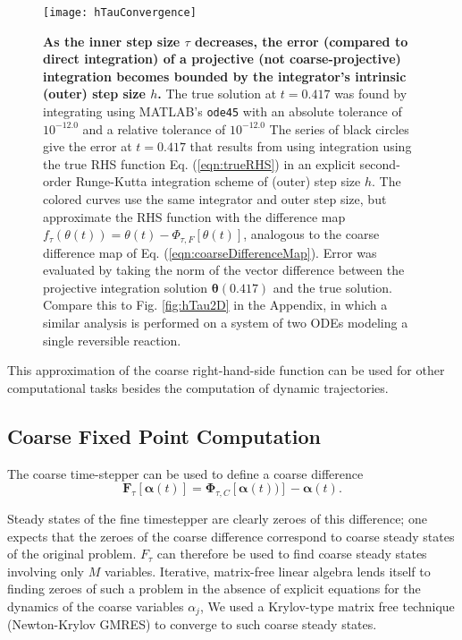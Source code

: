 \documentclass[numbers]{frontiersSCNS}
\renewcommand{\vec}[1]{\bm{#1}}
\newcommand{\numCofs}{{M}}
\newcommand{\figRef}[1]{Fig. \ref{fig:#1}}
\newcommand{\eqnRef}[1]{Eq. (\ref{eqn:#1})}
\DeclareRobustCommand{\inTstep}{\tau}
\DeclareRobustCommand{\outTstep}{h}
\newcommand{\dhdtDeltaTVal}{0.417}
\newcommand{\dhdtrtolLogTen}{-12.0}
\newcommand{\dhdtatolLogTen}{-12.0}
\begin{document}
\setcounter{subfigure}{0}\begin{figure}[ht]
\centering
%
\texttt{[image: hTauConvergence]}
\caption{
    \textbf{As the inner step size ${\inTstep}$ decreases,
    the error (compared to direct integration) of a projective (not coarse-projective) integration
    becomes bounded by the integrator's intrinsic (outer) step size ${\outTstep}$.}
    The true solution at $t=\dhdtDeltaTVal$ was found by integrating
    using MATLAB's \texttt{ode45} with an
    absolute tolerance of $10^{\dhdtatolLogTen}$ and a 
    relative tolerance of $10^{\dhdtrtolLogTen}$
    The series of black circles give the error at $t=\dhdtDeltaTVal$
    that results from using integration using the true RHS function \eqnRef{trueRHS}
    in an explicit second-order Runge-Kutta integration scheme
    of (outer) step size ${\outTstep}$.
    The colored curves use the same integrator and outer step size,
    but approximate the RHS function with the difference map
    $f_{\inTstep}(\theta(t)) = \theta(t) - \Phi_{{\inTstep},F}[\theta(t)]$,
    analogous to the coarse difference map of \eqnRef{coarseDifferenceMap}.
    Error was evaluated by taking the norm of the vector difference
    between the projective integration solution $\vec \theta(\dhdtDeltaTVal)$
    and the true solution.
    Compare this to \figRef{hTau2D} in the Appendix, in which a similar analysis is performed
    on a system of two ODEs modeling a single reversible reaction.
}
\label{fig:hTauPI}
\end{figure}
%


This approximation of the coarse right-hand-side function
can be used for other computational tasks
besides the computation of dynamic trajectories.


\subsection{Coarse Fixed Point Computation}
%
%
%
%
%
%

The coarse time-stepper can be used to define a coarse difference 
\begin{equation}
\label{eqn:coarseDifferenceMap}
\vec F_{\inTstep}[\vec\alpha(t)]
=
\vec \Phi_{{\inTstep},C}[\vec\alpha(t))]
-
\vec\alpha(t).
\end{equation}

Steady states of the fine timestepper are clearly zeroes
of this difference;
one expects that the zeroes of the coarse difference
correspond to coarse steady states of the original problem.
%
%
%
%
%
%
$F_{\inTstep}$ can therefore be used to find coarse steady states
involving only $\numCofs$ variables.
%
Iterative, matrix-free linear algebra lends itself to finding zeroes
of such a problem in the absence of explicit equations for the dynamics
of the coarse variables $\alpha_j$,
%
We used a Krylov-type matrix free technique (Newton-Krylov GMRES)
to converge to such coarse steady states.
\end{document}
